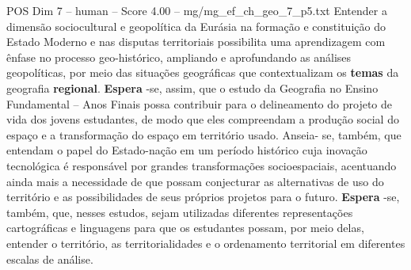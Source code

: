 \begin{textsample}{POS Dim 7 – human – Score 4.00 – mg/mg\_ef\_ch\_geo\_7\_p5.txt}  \label{ex:f7_pos_004}
Entender a dimensão sociocultural e geopolítica da Eurásia na formação e constituição do Estado Moderno e nas disputas territoriais possibilita uma aprendizagem com ênfase no processo geo-histórico, ampliando e aprofundando as análises geopolíticas, por meio das situações geográficas que contextualizam os \textbf{temas} da geografia \textbf{regional}. \textbf{Espera} -se, assim, que o estudo da Geografia no Ensino Fundamental – Anos Finais possa contribuir para o delineamento do projeto de vida dos jovens estudantes, de modo que eles compreendam a produção social do espaço e a transformação do espaço em território usado.
Anseia- se, também, que entendam o papel do Estado-nação em um período histórico cuja inovação tecnológica é responsável por grandes transformações socioespaciais, acentuando ainda mais a necessidade de que possam conjecturar as alternativas de uso do território e as possibilidades de seus próprios projetos para o futuro. \textbf{Espera} -se, também, que, nesses estudos, sejam utilizadas diferentes representações cartográficas e linguagens para que os estudantes possam, por meio delas, entender o território, as territorialidades e o ordenamento territorial em diferentes escalas de análise.

\end{textsample}
